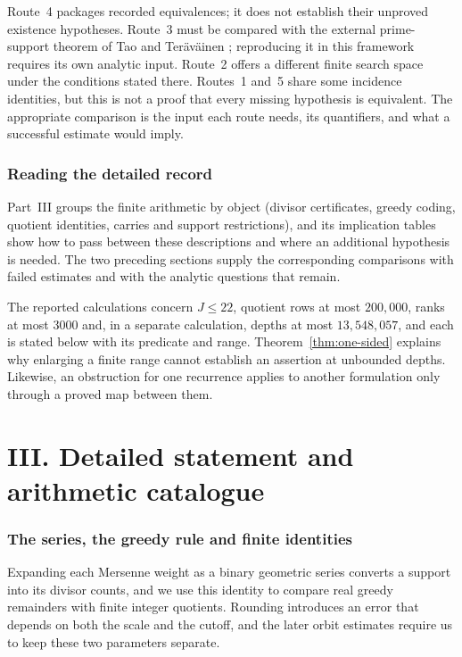 Route~4 packages recorded equivalences; it does not establish their
unproved existence hypotheses.  Route~3 must be compared with the external
prime-support theorem of Tao and Ter\"av\"ainen
\cite[Theorem~1.3]{taoteravainen2025}; reproducing it in this framework
requires its own analytic input.  Route~2 offers a different finite
search space under the conditions stated there.  Routes~1 and~5 share
some incidence identities, but this is not a proof that every missing
hypothesis is equivalent.  The appropriate comparison is the input each
route needs, its quantifiers, and what a successful estimate would imply.

\section{Reading the detailed record}
\label{sec:257-howto}
Part~III groups the finite arithmetic by object (divisor certificates,
greedy coding, quotient identities, carries and support restrictions),
and its implication tables show how to pass between these descriptions
and where an additional hypothesis is needed. The two preceding
sections supply the corresponding comparisons with failed estimates and
with the analytic questions that remain.

The reported calculations concern $J\le22$, quotient rows at most
$200{,}000$, ranks at most $3000$ and, in a separate calculation, depths
at most $13{,}548{,}057$, and each is stated below with its predicate
and range. Theorem~\ref{thm:one-sided} explains why enlarging a finite
range cannot establish an assertion at unbounded depths. Likewise, an
obstruction for one recurrence applies to another formulation only
through a proved map between them.
\clearpage
\part*{III. Detailed statement and arithmetic catalogue}
\section{The series, the greedy rule and finite identities}
Expanding each Mersenne weight as a binary geometric series converts a
support into its divisor counts, and we use this identity to compare
real greedy remainders with finite integer quotients. Rounding
introduces an error that depends on both the scale and the cutoff, and
the later orbit estimates require us to keep these two parameters
separate.


